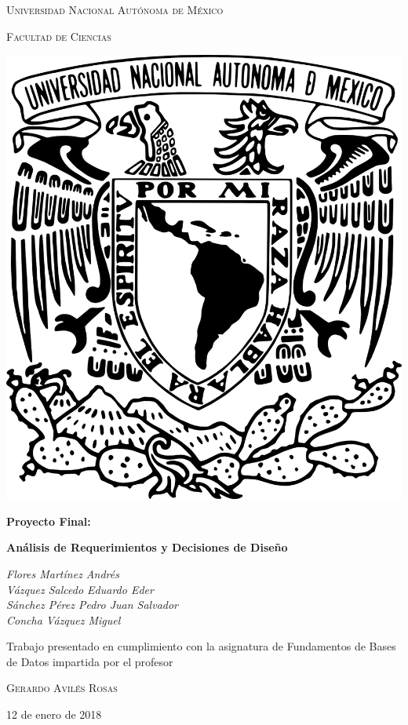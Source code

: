 \documentclass[11pt,letterpaper]{article}
\begin{document}
\begin{titlepage}
	\centering
	{\scshape\LARGE Universidad Nacional Autónoma de México \par}
	\vspace{1cm}
	{\scshape\Large Facultad de Ciencias\par}
	\vspace{1.5cm}
\begin{center}
		\includegraphics[scale=.5]{logo.png}
	\end{center}
		\vspace{.8 cm}

	{\huge\bfseries Proyecto Final: \par}
	{\huge\bfseries Análisis de Requerimientos y Decisiones de Diseño \par}
		\vspace{0.5cm}

	{\Large\itshape Flores Martínez Andrés\\
	Vázquez Salcedo Eduardo Eder\\
	Sánchez Pérez Pedro Juan Salvador\\
	Concha Vázquez Miguel\par}
	\vfill
			\vspace{0.5cm}

	Trabajo presentado en cumplimiento con la asignatura de Fundamentos de Bases de Datos impartida por el profesor	\par
	 \textsc{Gerardo Avilés Rosas}\\
	\vspace{0.1cm}
	{\large 12 de enero de 2018\par}
\end{titlepage}
\end{document}
